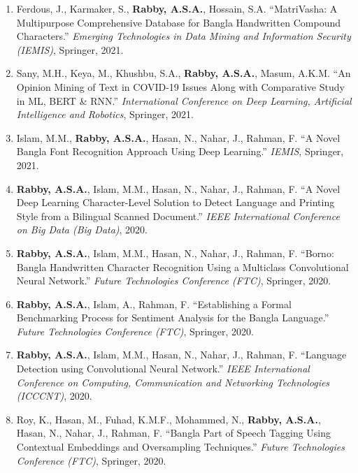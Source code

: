 \documentclass[11pt]{article}
\begin{document}
\begin{enumerate}
    \item Ferdous, J., Karmaker, S., \textbf{Rabby, A.S.A.}, Hossain, S.A. ``MatriVasha: A Multipurpose Comprehensive Database for Bangla Handwritten Compound Characters.'' \textit{Emerging Technologies in Data Mining and Information Security (IEMIS)}, Springer, 2021.
    
    \item Sany, M.H., Keya, M., Khushbu, S.A., \textbf{Rabby, A.S.A.}, Masum, A.K.M. ``An Opinion Mining of Text in COVID-19 Issues Along with Comparative Study in ML, BERT \& RNN.'' \textit{International Conference on Deep Learning, Artificial Intelligence and Robotics}, Springer, 2021.
    
    \item Islam, M.M., \textbf{Rabby, A.S.A.}, Hasan, N., Nahar, J., Rahman, F. ``A Novel Bangla Font Recognition Approach Using Deep Learning.'' \textit{IEMIS}, Springer, 2021.

    \item \textbf{Rabby, A.S.A.}, Islam, M.M., Hasan, N., Nahar, J., Rahman, F. ``A Novel Deep Learning Character-Level Solution to Detect Language and Printing Style from a Bilingual Scanned Document.'' \textit{IEEE International Conference on Big Data (Big Data)}, 2020.
    
    \item \textbf{Rabby, A.S.A.}, Islam, M.M., Hasan, N., Nahar, J., Rahman, F. ``Borno: Bangla Handwritten Character Recognition Using a Multiclass Convolutional Neural Network.'' \textit{Future Technologies Conference (FTC)}, Springer, 2020.
    
    \item \textbf{Rabby, A.S.A.}, Islam, A., Rahman, F. ``Establishing a Formal Benchmarking Process for Sentiment Analysis for the Bangla Language.'' \textit{Future Technologies Conference (FTC)}, Springer, 2020.
    
    \item \textbf{Rabby, A.S.A.}, Islam, M.M., Hasan, N., Nahar, J., Rahman, F. ``Language Detection using Convolutional Neural Network.'' \textit{IEEE International Conference on Computing, Communication and Networking Technologies (ICCCNT)}, 2020.

    \item Roy, K., Hasan, M., Fuhad, K.M.F., Mohammed, N., \textbf{Rabby, A.S.A.}, Hasan, N., Nahar, J., Rahman, F. ``Bangla Part of Speech Tagging Using Contextual Embeddings and Oversampling Techniques.'' \textit{Future Technologies Conference (FTC)}, Springer, 2020.
    

\end{enumerate}
\end{document}
